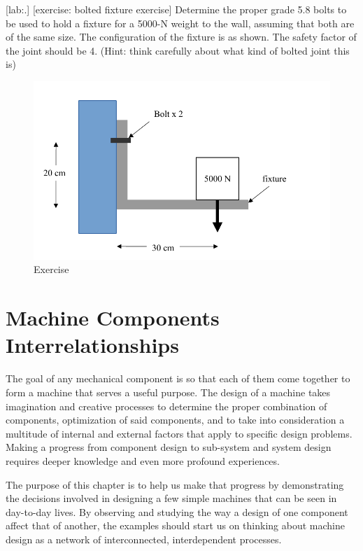 \documentclass[a4paper,openany,12pt]{book}
\begin{document}
{{[lab:.]
[exercise: bolted fixture exercise] Determine the proper grade 5.8 bolts
to be used to hold a fixture for a 5000-N weight to the wall, assuming
that both are of the same size. The configuration of the fixture is as
shown. The safety factor of the joint should be 4. (Hint: think
carefully about what kind of bolted joint this is)


\begin{figure}[htbp]
\centering
\includegraphics[width=.9\linewidth]{pictures/Bolt/bolted-fixture-exercise.pdf}
\caption{Exercise}
\end{figure}

\chapter{Machine Components Interrelationships}
\label{machine-components-interrelationships}
The goal of any mechanical component is so that each of them come
together to form a machine that serves a useful purpose. The design of a
machine takes imagination and creative processes to determine the proper
combination of components, optimization of said components, and to take
into consideration a multitude of internal and external factors that
apply to specific design problems. Making a progress from component
design to sub-system and system design requires deeper knowledge and
even more profound experiences.

The purpose of this chapter is to help us make that progress by
demonstrating the decisions involved in designing a few simple machines
that can be seen in day-to-day lives. By observing and studying the way
a design of one component affect that of another, the examples should
start us on thinking about machine design as a network of
interconnected, interdependent processes.

}}
\end{document}
